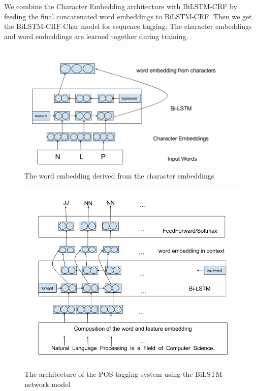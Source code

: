 \documentclass{sfuthesis}
\begin{document}
We combine the Character Embedding architecture with BiLSTM-CRF by feeding the final concatenated word embeddings to BiLSTM-CRF. Then we get the BiLSTM-CRF-Char model for sequence tagging. The character embeddings and word embeddings are learned together during training.

\begin{figure}
  \centering
  \includegraphics[scale=0.5]{charlstm.png}
 \caption{The word embedding derived from the character embeddings}
  \label{fig:charlstm}
\end{figure}

\begin{figure}
  \centering
  \includegraphics[scale=0.5]{bilstm.png}
 \caption{The architecture of the POS tagging system using the BiLSTM network model}
  \label{fig:bilstm}
\end{figure}
\end{document}

